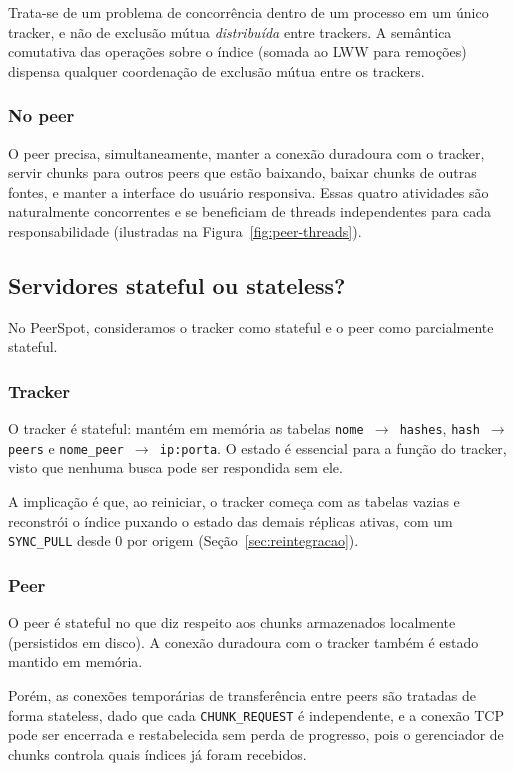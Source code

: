 \documentclass[12pt, a4paper]{article}
\begin{document}
Trata-se de um problema de concorrência dentro de um processo em um único tracker, e não de exclusão mútua \textit{distribuída} entre trackers. A semântica comutativa das operações sobre o índice (somada ao LWW para remoções) dispensa qualquer coordenação de exclusão mútua entre os trackers.

\subsubsection*{No peer}
O peer precisa, simultaneamente, manter a conexão duradoura com o tracker, servir chunks para outros peers que estão baixando, baixar chunks de outras fontes, e manter a interface do usuário responsiva. Essas quatro atividades são naturalmente concorrentes e se beneficiam de threads independentes para cada responsabilidade (ilustradas na Figura~\ref{fig:peer-threads}).

\subsection{Servidores stateful ou stateless?}

No PeerSpot, consideramos o tracker como stateful e o peer como parcialmente stateful.

\subsubsection*{Tracker}

O tracker é stateful: mantém em memória as tabelas \texttt{nome $\rightarrow$ hashes}, \texttt{hash $\rightarrow$ peers} e \texttt{nome\_peer $\rightarrow$ ip:porta}. O estado é essencial para a função do tracker, visto que nenhuma busca pode ser respondida sem ele.

A implicação é que, ao reiniciar, o tracker começa com as tabelas vazias e reconstrói o índice puxando o estado das demais réplicas ativas, com um \texttt{SYNC\_PULL} desde 0 por origem (Seção~\ref{sec:reintegracao}).

\subsubsection*{Peer}

O peer é stateful no que diz respeito aos chunks armazenados localmente (persistidos em disco). A conexão duradoura com o tracker também é estado mantido em memória. 

Porém, as conexões temporárias de transferência entre peers são tratadas de forma stateless, dado que cada \texttt{CHUNK\_REQUEST} é independente, e a conexão TCP pode ser encerrada e restabelecida sem perda de progresso, pois o gerenciador de chunks controla quais índices já foram recebidos.
\end{document}

